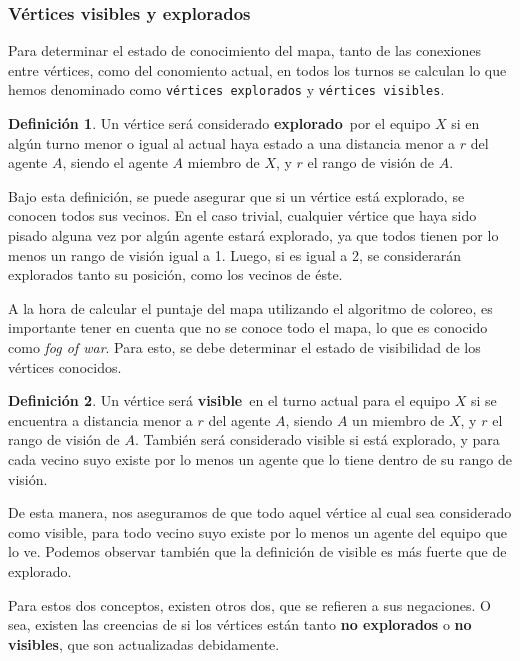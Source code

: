 \documentclass[oneside]{book}
\theoremstyle{definition}
\newtheorem{definicion}{Definición}[section]
\theoremstyle{example}
\begin{document}
\subsubsection{Vértices visibles y explorados}

Para determinar el estado de conocimiento del mapa, tanto de las conexiones
entre vértices, como del conomiento actual, en todos los turnos se calculan
lo que hemos denominado como \texttt{vértices explorados} y \texttt{vértices 
visibles}. 

\begin{definicion}
Un vértice será considerado \textbf{explorado}\ por el equipo $X$ si en algún 
turno menor o igual al actual haya estado a una distancia menor a $r$ del agente
$A$, siendo el agente $A$ miembro de $X$, y $r$ el rango de visión de $A$.
\end{definicion}

Bajo esta definición, se puede asegurar que si un vértice está explorado, se 
conocen todos sus vecinos. En el caso trivial, cualquier vértice que haya sido
pisado alguna vez por algún agente estará explorado, ya que todos tienen por lo 
menos un rango de visión igual a 1. Luego, si es igual a 2, se considerarán
explorados tanto su posición, como los vecinos de éste.

A la hora de calcular el puntaje del mapa utilizando el algoritmo de coloreo,
es importante tener en cuenta que no se conoce todo el mapa, lo que es conocido 
como \textit{fog of war}. Para esto, se debe determinar el estado de visibilidad
de los vértices conocidos. 

\begin{definicion}
Un vértice será \textbf{visible}\ en el turno actual para el equipo $X$ si se 
encuentra a distancia 
menor a $r$ del agente $A$, siendo $A$ un miembro de $X$, y $r$ el rango de visión 
de $A$. También será considerado visible si está explorado, y para cada vecino suyo 
existe por lo menos un agente que lo tiene dentro de su rango de visión.
\end{definicion}

De esta manera, nos aseguramos de que todo aquel vértice al cual sea considerado 
como visible, para todo vecino suyo existe por lo menos un agente del equipo 
que lo ve. Podemos observar también que la definición de visible es más fuerte que
de explorado.

Para estos dos conceptos, existen otros dos, que se refieren a sus negaciones. O 
sea, existen las creencias de si los vértices están tanto \textbf{no explorados}
o \textbf{no visibles}, que son actualizadas debidamente.
\end{document}
